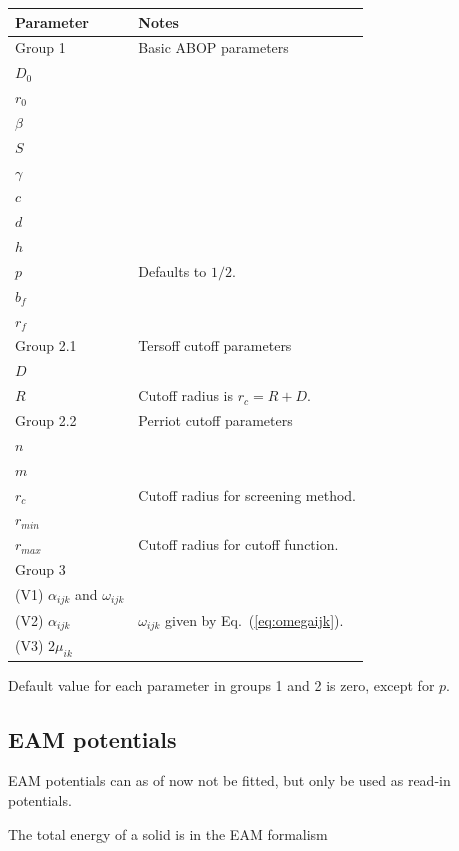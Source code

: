 \documentclass[a4paper,12pt,pdftex,onecolumn]{article}
\begin{document}
\begin{center}
\begin{tabular}{|l|l|}
\hline
\hline
Parameter & Notes \\
\hline
\hline
Group 1 & Basic ABOP parameters \\
\hline
$D_0$ & \\
$r_0$ & \\
$\beta$ & \\
$S$ & \\
$\gamma$ & \\
$c$ & \\
$d$ & \\
$h$ & \\
$p$ & Defaults to $1/2$. \\
$b_f$ & \\
$r_f$ & \\
\hline
Group 2.1 & Tersoff cutoff parameters \\
\hline
$D$ & \\
$R$ & Cutoff radius is $r_c = R + D$. \\
\hline
Group 2.2 & Perriot cutoff parameters \\
\hline
$n$ & \\
$m$ & \\
$r_c$ & Cutoff radius for screening method. \\
$r_{min}$ & \\
$r_{max}$ & Cutoff radius for cutoff function. \\
\hline
Group 3 & \\
\hline
(V1) $\alpha_{ijk}$ and $\omega_{ijk}$ & \\
(V2) $\alpha_{ijk}$ & $\omega_{ijk}$ given by Eq.~(\ref{eq:omegaijk}).\\
(V3) $2\mu_{ik}$ & \\
\hline
\hline
\end{tabular}
\end{center}

Default value for each parameter in groups 1 and 2 is zero, except for
$p$.



\subsection{EAM potentials}

EAM potentials can as of now not be fitted, but only be used
as read-in potentials.

The total energy of a solid is in the EAM formalism
\end{document}
